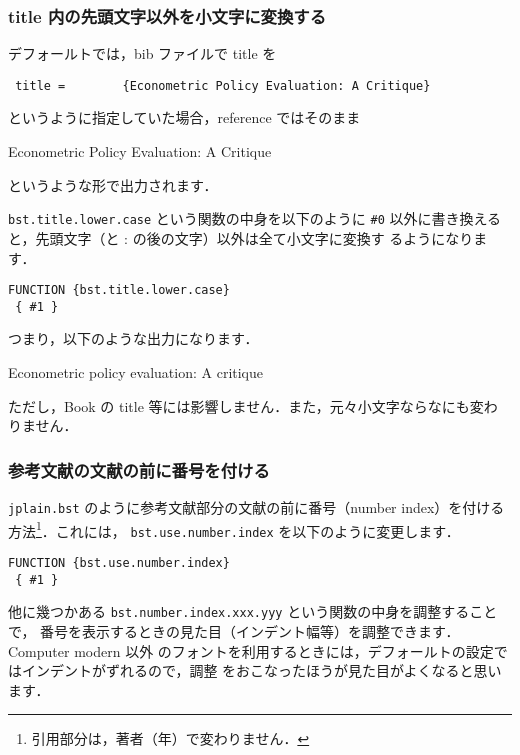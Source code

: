 \documentclass[article]{jlreq}
\begin{document}
\subsubsection{title 内の先頭文字以外を小文字に変換する}

デフォールトでは，bib ファイルで title を
\begin{center}
  \verb| title =        {Econometric Policy Evaluation: A Critique}|
\end{center}
というように指定していた場合，reference ではそのまま
\begin{center}
 Econometric Policy Evaluation: A Critique
\end{center}
というような形で出力されます．

\texttt{bst.title.lower.case} という関数の中身を以下のように \verb|#0| 
以外に書き換えると，先頭文字（と : の後の文字）以外は全て小文字に変換す
るようになります．
\begin{screen}
\begin{verbatim}
FUNCTION {bst.title.lower.case}
 { #1 }
\end{verbatim}
\end{screen}

つまり，以下のような出力になります．
\begin{center}
 Econometric policy evaluation: A critique
\end{center}

ただし，Book の title 等には影響しません．また，元々小文字ならなにも変わ
りません．

\subsubsection{参考文献の文献の前に番号を付ける}

\texttt{jplain.bst} のように参考文献部分の文献の前に番号（number index）を付ける
方法\footnote{引用部分は，著者（年）で変わりません．}．これには，
\texttt{bst.use.number.index} を以下のように変更します．
\begin{screen}
\begin{verbatim}
FUNCTION {bst.use.number.index}
 { #1 }
\end{verbatim}
\end{screen}

他に幾つかある \texttt{bst.number.index.xxx.yyy} という関数の中身を調整することで，
番号を表示するときの見た目（インデント幅等）を調整できます．Computer modern 以外
のフォントを利用するときには，デフォールトの設定ではインデントがずれるので，調整
をおこなったほうが見た目がよくなると思います．
\end{document}
